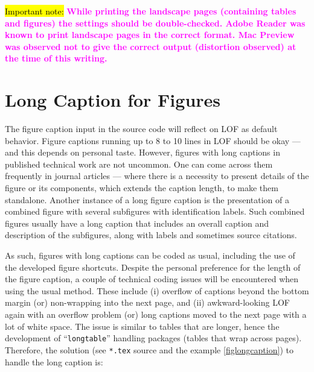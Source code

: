 \documentclass[phd]{ndsu-thesis-2022}
\newcommand\italk[1]{\textcolor{blue}{#1}}  %
\begin{document}
\italk{\hl{Important note:}} \textcolor{magenta}{\bfseries While printing the landscape pages (containing tables and figures) the settings should be double-checked. Adobe Reader was known to print landscape pages in the correct format. Mac Preview was observed not to give the correct output (distortion observed) at the time of this writing.}

\kant[4]



\section{Long Caption for Figures}

The figure caption input in the source code will reflect on LOF as default behavior. Figure captions running up to 8 to 10 lines in LOF should be okay --- and this depends on personal taste. However, figures with long captions in published technical work are not uncommon. One can come across them frequently in journal articles --- where there is a necessity to present details of the figure or its components, which extends the caption length, to make them standalone. Another instance of a long figure caption is the presentation of a combined figure with several subfigures with identification labels. Such combined figures usually have a long caption that includes an overall caption and description of the subfigures, along with labels and sometimes source citations.

As such, figures with long captions can be coded as usual, including the use of the developed figure shortcuts. Despite the personal preference for the length of the figure caption, a couple of technical coding issues will be encountered when using the usual method. These include (i) overflow of captions beyond the bottom margin (or) non-wrapping into the next page, and (ii) awkward-looking LOF again with an overflow problem (or) long captions moved to the next page with a lot of white space. The issue is similar to tables that are longer, hence the development of ``\texttt{longtable}'' handling packages (tables that wrap across pages). Therefore, the solution (see \texttt{*.tex} source and the example \cref{figlongcaption}) to handle the long caption is:
\end{document}
